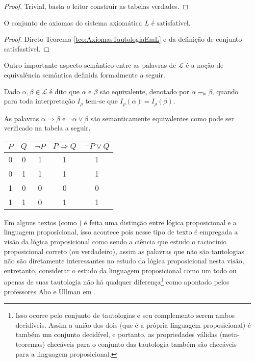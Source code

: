 \begin{proof}
  Trivial, basta o leitor construir as tabelas verdades.
\end{proof}

\begin{corolario}\label{col:AxiomasTautologiaEmL}
  O conjunto de axiomas do sistema axiomática $L$ é satisfatível.
\end{corolario}

\begin{proof}
  Direto Teorema \ref{teo:AxiomasTautologiaEmL} e da definição de conjunto satisfastível.
\end{proof}

Outro importante aspecto semântico entre as palavras de $\mathcal{L}$ é a noção de equivalência semântica definida formalmente a seguir.

\begin{definicao}\label{def:EquivalenciaSemantica}
  Dado $\alpha, \beta \in \mathcal{L}$ é dito que $\alpha$ e $\beta$ são equivalente, denotado por $\alpha \equiv_\vDash \beta$, quando para toda interpretação $I_\rho$ tem-se que $I_\rho(\alpha) = I_\rho(\beta)$.
\end{definicao}

\begin{exemplo}
  As palavras $\alpha \Rightarrow \beta$ e $\neg \alpha \lor \beta$ são semanticamente equivalentes como pode ser verificado na tabela a seguir.

  \begin{table}[H]
    \centering
    \begin{tabular}{|c|c|c|c|c|}
        \hline
        $P$ & $Q$ & $\neg P$ & $P \Rightarrow Q$ & $\neg P \lor Q$\\
        \hline
        0 & 0 & 1 & 1 & 1\\ \hline
        0 & 1 & 1 & 1 & 1\\ \hline
        1 & 0 & 0 & 0 & 0\\ \hline
        1 & 1 & 0 & 1 & 1\\ \hline
    \end{tabular}
  \end{table}
\end{exemplo}

Em alguns textos (como \cite{benja-Logica}) é feita uma distinção entre lógica proposicional e a linguagem proposicional, isso acontece pois nesse tipo de texto é empregada a visão da lógica proposicional como sendo a ciência que estudo o raciocínio proposicional correto (ou verdadeiro), assim as palavras que não são tautologias não são diretamente interessantes no estudo da lógica proposicional nesta visão, entretanto, considerar o estudo da linguagem proposicional como um todo ou apenas de suas tautologia não há qualquer diferença\footnote{Isso ocorre pelo conjunto de tautologias e seu complemento serem ambos decidíveis. Assim a união dos dois (que é a própria linguagem proposicional) é também um conjunto decidível, e portanto, as propriedades válidas (meta-teoremas) checáveis para o conjunto das tautologia também são checáveis para a linguagem proposicional.} como apontado pelos professores Aho e Ullman em \cite{ullman1992}.

